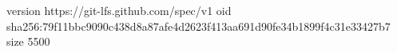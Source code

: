 version https://git-lfs.github.com/spec/v1
oid sha256:79f11bbc9090c438d8a87afe4d2623f413aa691d90fe34b1899f4c31e33427b7
size 5500

